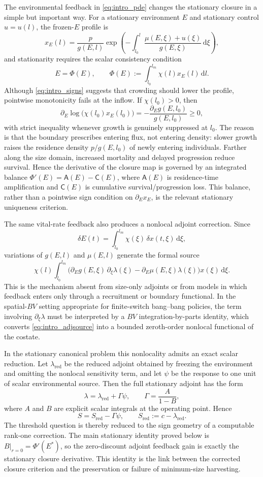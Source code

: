 \documentclass[pdflatex,sn-mathphys-num]{sn-jnl}
\newcommand{\dd}{\,\mathrm{d}}
\theoremstyle{plain}
\theoremstyle{definition}
\theoremstyle{remark}
\begin{document}
The environmental feedback in \eqref{eq:intro_pde} changes the stationary closure
in a simple but important way. For a stationary environment $E$ and stationary
control $u=u(l)$, the frozen-$E$ profile is
\[
x_E(l)
=
\frac{p}{g(E,l)}
\exp\!\left(
-\int_{l_0}^{l}
\frac{\mu(E,\xi)+u(\xi)}{g(E,\xi)}
\dd\xi
\right),
\]
and stationarity requires the scalar consistency condition
\[
E=\Phi(E),
\qquad
\Phi(E):=
\int_{l_0}^{l_m}\chi(l)x_E(l)\dd l.
\]
Although \eqref{eq:intro_signs} suggests that crowding should lower the profile,
pointwise monotonicity fails at the inflow. If $\chi(l_0)>0$, then
\[
\partial_E\log\!\big(\chi(l_0)x_E(l_0)\big)
=
-\frac{\partial_Eg(E,l_0)}{g(E,l_0)}
\ge0,
\]
with strict inequality whenever growth is genuinely suppressed at $l_0$. The
reason is that the boundary prescribes entering flux, not entering density:
slower growth raises the residence density $p/g(E,l_0)$ of newly entering
individuals. Farther along the size domain, increased mortality and delayed
progression reduce survival. Hence the derivative of the closure map is governed
by an integrated balance
$\displaystyle \Phi'(E)=\mathsf A(E)-\mathsf C(E)$,
where $\mathsf A(E)$ is residence-time amplification and $\mathsf C(E)$ is
cumulative survival/progression loss. This balance, rather than a pointwise sign
condition on $\partial_E x_E$, is the relevant stationary uniqueness criterion.

The same vital-rate feedback also produces a nonlocal adjoint correction. Since
\[
\delta E(t)=\int_{l_0}^{l_m}\chi(\xi)\,\delta x(t,\xi)\dd\xi,
\]
variations of $g(E,l)$ and $\mu(E,l)$ generate the formal source
\begin{equation}\label{eq:intro_adjsource}
\chi(l)
\int_{l_0}^{l_m}
\Big(
\partial_Eg(E,\xi)\,\partial_\xi\lambda(\xi)
-
\partial_E\mu(E,\xi)\lambda(\xi)
\Big)
x(\xi)\dd\xi .
\end{equation}
This is the mechanism absent from size-only adjoints or from models in which
feedback enters only through a recruitment or boundary functional. In the
spatial-$BV$ setting appropriate for finite-switch bang--bang policies, the term
involving $\partial_\xi\lambda$ must be interpreted by a $BV$
integration-by-parts identity, which converts \eqref{eq:intro_adjsource} into a
bounded zeroth-order nonlocal functional of the costate.

In the stationary canonical problem this nonlocality admits an exact scalar
reduction. Let $\lambda_{\mathrm{red}}$ be the reduced adjoint obtained by
freezing the environment and omitting the nonlocal sensitivity term, and let
$\psi$ be the response to one unit of scalar environmental source. Then the full
stationary adjoint has the form
\[
\lambda
=
\lambda_{\mathrm{red}}+\Gamma\psi,
\qquad
\Gamma=\frac{A}{1-B},
\]
where $A$ and $B$ are explicit scalar integrals at the operating point. Hence
\[
S=S_{\mathrm{red}}-\Gamma\psi,
\qquad
S_{\mathrm{red}}:=c-\lambda_{\mathrm{red}}.
\]
The threshold question is thereby reduced to the sign geometry of a computable
rank-one correction. The main stationary identity proved below is
$\displaystyle B|_{r=0}=\Phi'(E^*)$,
so the zero-discount adjoint feedback gain is exactly the stationary closure
derivative. This identity is the link between the corrected closure criterion and
the preservation or failure of minimum-size harvesting.
\end{document}
